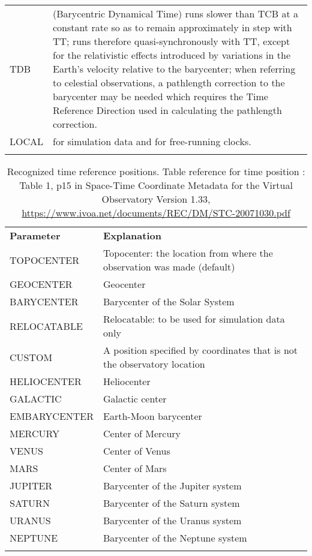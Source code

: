 \begin{table}
\begin{center}
\begin{tabular}{p{}p{}}
TDB   & (Barycentric Dynamical Time) runs slower than TCB at a constant rate so as to remain approximately in step with TT; runs therefore quasi-synchronously with TT, except for the relativistic effects introduced by variations in the Earth’s velocity relative to the barycenter; when referring to celestial observations, a pathlength correction to the barycenter may be needed which requires the Time Reference Direction used in calculating the pathlength correction.\\
LOCAL & for simulation data and for free-running clocks.\\
    \sptablerule
      \end{tabular}
  \end{center}
\end{table}


\begin{table}
  \begin{center}
    \caption{Recognized time reference positions. Table reference for time position : Table 1, p15 in Space-Time Coordinate Metadata for the Virtual Observatory
Version 1.33, \url{https://www.ivoa.net/documents/REC/DM/STC-20071030.pdf} }\label{tab:positions}
      \begin{tabular}{p{}p{}}
      \sptablerule
      \textbf{Parameter} & \textbf{Explanation} \\\sptablerule
TOPOCENTER  &	Topocenter: the location from where the observation was made (default)\\
GEOCENTER   &	Geocenter\\
BARYCENTER  &	Barycenter of the Solar System\\
RELOCATABLE &	Relocatable: to be used for simulation data only\\
CUSTOM	    & A position specified by coordinates that is not the observatory location\\
HELIOCENTER & 	Heliocenter\\
GALACTIC    &	Galactic center\\
EMBARYCENTER&	Earth-Moon barycenter\\
MERCURY	    & Center of Mercury\\
VENUS	    & Center of Venus\\
MARS	    & Center of Mars\\
JUPITER	    & Barycenter of the Jupiter system\\
SATURN	    & Barycenter of the Saturn system\\
URANUS	    & Barycenter of the Uranus system\\
NEPTUNE	    & Barycenter of the Neptune system\\
          \sptablerule
      \end{tabular}
      \end{center}
\end{table}

  
